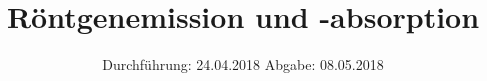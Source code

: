 

\subject{602}
\title{Röntgenemission und -absorption}
\date{%
  Durchführung: 24.04.2018
  \hspace{3em}
  Abgabe: 08.05.2018
}



\maketitle
\thispagestyle{empty}
\tableofcontents
\newpage







\printbibliography{}


